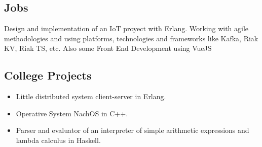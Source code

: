 \documentclass[10pt,a4paper]{moderncv}        %
\begin{document}
  \subsection{Jobs}
  {Design and implementation of an IoT proyect with Erlang. Working with agile methodologies and\newline
  {using platforms, technologies and frameworks like Kafka, Riak KV, Riak TS, etc. \newline Also some Front End Development using VueJS}
}
  \subsection{College Projects}
    \begin{itemize}
      \item Little distributed system client-server in Erlang.
      \item Operative System NachOS in C++.
      \item Parser and evaluator of an interpreter of simple arithmetic expressions and lambda calculus in Haskell.
    \end{itemize}
\end{document}
